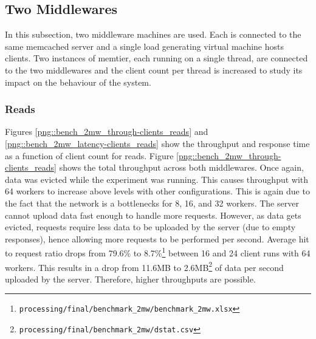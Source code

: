 \documentclass[11pt,a4paper]{article}
\begin{document}
\subsection{Two Middlewares}
In this subsection, two middleware machines are used. Each is connected to the same memcached server and a single load generating virtual machine hosts clients. Two instances of memtier, each running on a single thread, are connected to the two middlewares and the client count per thread is increased to study its impact on the behaviour of the system.

\subsubsection{Reads}
Figures \ref{png::bench_2mw_through-clients_reads} and \ref{png::bench_2mw_latency-clients_reads} show the throughput and response time as a function of client count for reads. Figure \ref{png::bench_2mw_through-clients_reads} shows the total throughput across both middlewares. Once again, data was evicted while the experiment was running. This causes throughput with 64 workers to increase above levels with other configurations. This is again due to the fact that the network is a bottlenecks for 8, 16, and 32 workers. The server cannot upload data fast enough to handle more requests. However, as data gets evicted, requests require less data to be uploaded by the server (due to empty responses), hence allowing more requests to be performed per second. Average hit to request ratio drops from 79.6\% to 8.7\%\footnote{\texttt{processing/final/benchmark_2mw/benchmark_2mw.xlsx}} between 16 and 24 client runs with 64 workers. This results in a drop from 11.6MB to 2.6MB\footnote{\texttt{processing/final/benchmark_2mw/dstat.csv}} of data per second uploaded by the server. Therefore, higher throughputs are possible.
\end{document}
